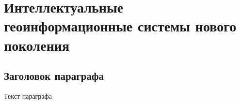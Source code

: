 \chapter{Интеллектуальные геоинформационные системы нового поколения}
\label{chapter_gis}


\section{Заголовок параграфа}
Текст параграфа

%